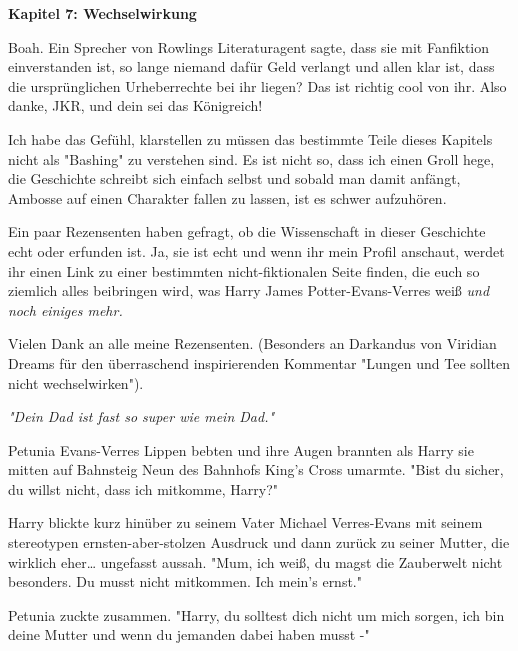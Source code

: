 

\hypertarget{wechselwirkung}{%

\textbf{Kapitel 7: Wechselwirkung}

Boah. Ein Sprecher von Rowlings Literaturagent sagte, dass sie mit Fanfiktion einverstanden ist, so lange niemand dafür Geld verlangt und allen klar ist, dass die ursprünglichen Urheberrechte bei ihr liegen? Das ist richtig cool von ihr. Also danke, JKR, und dein sei das Königreich!

\later

Ich habe das Gefühl, klarstellen zu müssen das bestimmte Teile dieses Kapitels nicht als "Bashing" zu verstehen sind. Es ist nicht so, dass ich einen Groll hege, die Geschichte schreibt sich einfach selbst und sobald man damit anfängt, Ambosse auf einen Charakter fallen zu lassen, ist es schwer aufzuhören.

Ein paar Rezensenten haben gefragt, ob die Wissenschaft in dieser Geschichte echt oder erfunden ist. Ja, sie ist echt und wenn ihr mein Profil anschaut, werdet ihr einen Link zu einer bestimmten nicht-fiktionalen Seite finden, die euch so ziemlich alles beibringen wird, was Harry James Potter-Evans-Verres weiß \emph{und noch einiges mehr.}

Vielen Dank an alle meine Rezensenten. (Besonders an Darkandus von Viridian Dreams für den überraschend inspirierenden Kommentar "Lungen und Tee sollten nicht wechselwirken").

\later

\emph{"Dein Dad ist fast so super wie mein Dad."}

\later

Petunia Evans-Verres Lippen bebten und ihre Augen brannten als Harry sie mitten auf Bahnsteig Neun des Bahnhofs King's Cross umarmte. "Bist du sicher, du willst nicht, dass ich mitkomme, Harry?"

Harry blickte kurz hinüber zu seinem Vater Michael Verres-Evans mit seinem stereotypen ernsten-aber-stolzen Ausdruck und dann zurück zu seiner Mutter, die wirklich eher… ungefasst aussah. "Mum, ich weiß, du magst die Zauberwelt nicht besonders. Du musst nicht mitkommen. Ich mein's ernst."

Petunia zuckte zusammen. "Harry, du solltest dich nicht um mich sorgen, ich bin deine Mutter und wenn du jemanden dabei haben musst -"

}
